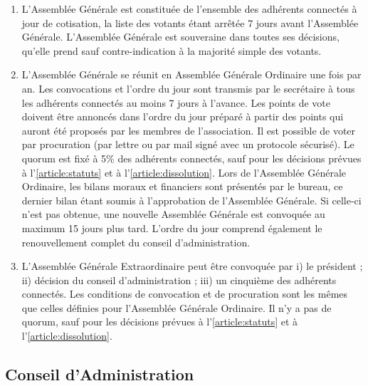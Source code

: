 \documentclass[12pt, a4paper]{article}
\begin{document}
\begin{enumerate}
    \item L’Assemblée Générale est constituée de l’ensemble des adhérents connectés à jour de cotisation, la liste des votants étant arrêtée 7 jours avant l’Assemblée Générale. L’Assemblée Générale est souveraine dans toutes ses décisions, qu’elle prend sauf contre-indication à la majorité simple des votants.
    \item L’Assemblée Générale se réunit en Assemblée Générale Ordinaire une fois par an. Les convocations et l’ordre du jour sont transmis par le secrétaire à tous les adhérents connectés au moins 7 jours à l’avance. Les points de vote doivent être annoncés dans l’ordre du jour préparé à partir des points qui auront été proposés par les membres de l’association. Il est possible de voter par procuration (par lettre ou par mail signé avec un protocole sécurisé). Le quorum est fixé à 5\% des adhérents connectés, sauf pour les décisions prévues à l'\ref{article:statuts} et à l'\ref{article:dissolution}. Lors de l’Assemblée Générale Ordinaire, les bilans moraux et financiers sont présentés par le bureau, ce dernier bilan étant soumis à l’approbation de l’Assemblée Générale. Si celle-ci n’est pas obtenue, une nouvelle Assemblée Générale est convoquée au maximum 15 jours plus tard. L’ordre du jour comprend également le renouvellement complet du conseil d’administration.
    \item L’Assemblée Générale Extraordinaire peut être convoquée par i) le président ; ii) décision du conseil d’administration ; iii) un cinquième des adhérents connectés. Les conditions de convocation et de procuration sont les mêmes que celles définies pour l’Assemblée Générale Ordinaire. Il n’y a pas de quorum, sauf pour les décisions prévues à l'\ref{article:statuts} et à l'\ref{article:dissolution}.
\end{enumerate}

\subsection{Conseil d’Administration} \label{article:ca}
\end{document}
